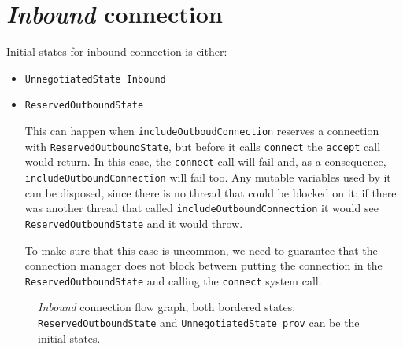 \documentclass{article}
\def\ReservedOutboundState{\texttt{ReservedOutboundState}}
\def\UnnegotiatedStateIn{\texttt{UnnegotiatedState Inbound}}
\def\DuplexState{\texttt{DuplexState}}
\def\InboundStateUni{\texttt{InboundState Unidirectional}}
\def\InboundStateDup{\texttt{InboundState Duplex}}
\begin{document}
\section{\textit{Inbound} connection}

Initial states for inbound connection is either:

\begin{itemize}
  \item \UnnegotiatedStateIn{}
  \item \ReservedOutboundState{}

    This can happen when \texttt{includeOutboudConnection} reserves
    a connection with \ReservedOutboundState{}, but before it calls
    \texttt{connect} the \texttt{accept} call would return.  In this case, the
    \texttt{connect} call will fail and, as a consequence,
    \texttt{includeOutboundConnection} will fail too.  Any mutable variables
    used by it can be disposed, since there is no thread that could be blocked
    on it: if there was another thread that called
    \texttt{includeOutboundConnection} it would see \ReservedOutboundState{}
    and it would throw.

    To make sure that this case is uncommon, we need to guarantee that the
    connection manager does not block between putting the connection in the
    \ReservedOutboundState{} and calling the \texttt{connect} system call.
\end{itemize}

\begin{figure}[h]
  \footnotesize{}
  \caption{\textit{Inbound} connection flow graph, both bordered states:
  \ReservedOutboundState{} and \texttt{UnnegotiatedState prov} can be the
  initial states.}
\end{figure}
\end{document}
